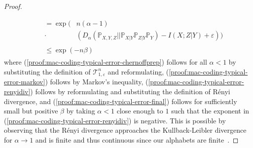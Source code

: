 \documentclass[journal]{IEEEtran}
\newcommand{\channelInOne}{X}
\newcommand{\channelInTwo}{Y}
\newcommand{\channelOut}{Z}
\newcommand{\codebookBlocklength}{n}
\newcommand{\mutualInformationConditional}[3]{I(#1;#2|#3)}
\newcommand{\renyiParam}{\alpha}
\newcommand{\proofconstantOne}{{\beta}}
\newcommand{\renyidiv}[3]{D_{#1}\left({#2} || {#3}\right)}
\newcommand{\Probability}{\mathbb{P}}
\newcommand{\typicalityParam}{\varepsilon}
\newcommand{\typicalSetIndex}[3]{\mathcal{T}_{#3,#1}^{#2}}
\begin{document}
\begin{proof}
\begin{align}
\begin{aligned}
\end{aligned}
\\
\label{proof:mac-coding-typical-error-renyidiv}
&\begin{aligned}
=
\exp\Big(
  &\codebookBlocklength
  (\renyiParam-1)
  \\
  \cdot
  &\left(
    \renyidiv{\renyiParam}{\Probability_{\channelInOne, \channelInTwo, \channelOut}}
                          {\Probability_{\channelInOne | \channelInTwo}\Probability_{\channelOut | \channelInTwo}\Probability_{\channelInTwo}}
    -
    \mutualInformationConditional{\channelInOne}{\channelOut}{\channelInTwo}
    +
    \typicalityParam
  \right)
\Big)
\end{aligned}
\\
\label{proof:mac-coding-typical-error-final}
&\begin{aligned}
\leq
\exp(-\codebookBlocklength\proofconstantOne)
\end{aligned}
\end{align}
where (\ref{proof:mac-coding-typical-error-chernoffprep}) follows for all $\renyiParam < 1$ by substituting the definition of $\typicalSetIndex{\typicalityParam}{\codebookBlocklength}{1}$ and reformulating, (\ref{proof:mac-coding-typical-error-markov}) follows by Markov's inequality, (\ref{proof:mac-coding-typical-error-renyidiv}) follows by reformulating and substituting the definition of Rényi divergence, and (\ref{proof:mac-coding-typical-error-final}) follows for sufficiently small but positive $\proofconstantOne$ by taking $\renyiParam < 1$ close enough to $1$ such that the exponent in (\ref{proof:mac-coding-typical-error-renyidiv}) is negative. This is possible by observing that the Rényi divergence approaches the Kullback-Leibler divergence for $\renyiParam \rightarrow 1$ and is finite and thus continuous since our alphabets are finite~\cite{RenyiDiv}.


\end{proof}
\end{document}
